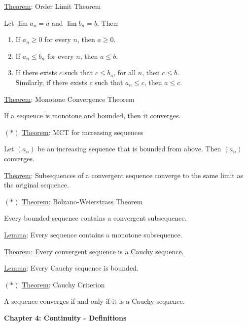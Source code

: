 \documentclass[12pt]{article}
\begin{document}
\hrulefill

\underline{Theorem}: Order Limit Theorem

Let $\lim a_n = a$ and $\lim b_n = b$. Then:

\begin{enumerate}
\item If $a_n \ge 0$ for every $n$, then $a \ge 0$.
\item If $a_n \le b_n$ for every $n$, then $a \le b$.
\item If there exists $c$ such that $c \le b_n$, for all $n$, then $c \le b$.
\\
Similarly, if there exists $c$ such that $a_n \le c$, then $a \le c$.
\end{enumerate}

\hrulefill

\underline{Theorem}: Monotone Convergence Theorem

If a sequence is monotone and bounded, then it converges.

\hrulefill

$(\ast)$ \underline{Theorem}: MCT for increasing sequences

Let $(a_n)$ be an increasing sequence that is bounded from above. Then $(a_n)$ converges.

\pagebreak

\underline{Theorem}: Subsequences of a convergent sequence converge to the same limit as the original sequence.

\hrulefill

$(\ast)$ \underline{Theorem}: Bolzano-Weierstrass Theorem

Every bounded sequence contains a convergent subsequence.

\hrulefill

\underline{Lemma}: Every sequence contains a monotone subsequence.

\hrulefill

\underline{Theorem}: Every convergent sequence is a Cauchy sequence.

\hrulefill

\underline{Lemma}: Every Cauchy sequence is bounded.

\hrulefill

$(\ast)$ \underline{Theorem}: Cauchy Criterion

A sequence converges if and only if it is a Cauchy sequence.

\pagebreak

\textbf{Chapter 4: Continuity - Definitions}
\end{document}
